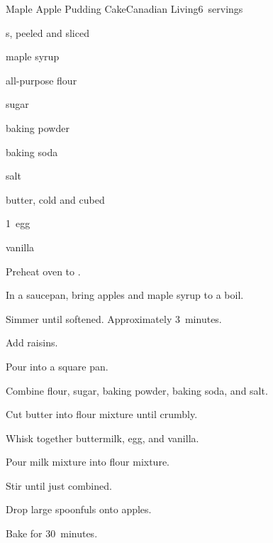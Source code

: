\begin{recipe}{Maple Apple Pudding Cake}{Canadian Living}{6~servings}

\begin{ingredients}
\item {} s, peeled and sliced
\item \C{\twothird} maple syrup
\item \C{\third} 
\item {} all-purpose flour
\item \C{\quarter} sugar
\item \tp{1\half} baking powder
\item \tp{\half} baking soda
\item \tp{\quarter} salt
\item \C{\quarter} butter, cold and cubed
\item \C{\half} 
\item 1~egg
\item {} vanilla
\end{ingredients}

\begin{directions}
\item Preheat oven to .
\item In a saucepan, bring apples and maple syrup to a boil.
\item Simmer until softened. Approximately 3~minutes.
\item Add raisins.
\item Pour into a  square pan.
\item Combine flour, sugar, baking powder, baking soda, and salt.
\item Cut butter into flour mixture until crumbly.
\item Whisk together buttermilk, egg, and vanilla.
\item Pour milk mixture into flour mixture.
\item Stir until just combined.
\item Drop large spoonfuls onto apples.
\item Bake for 30~minutes.
\end{directions}
\end{recipe}
